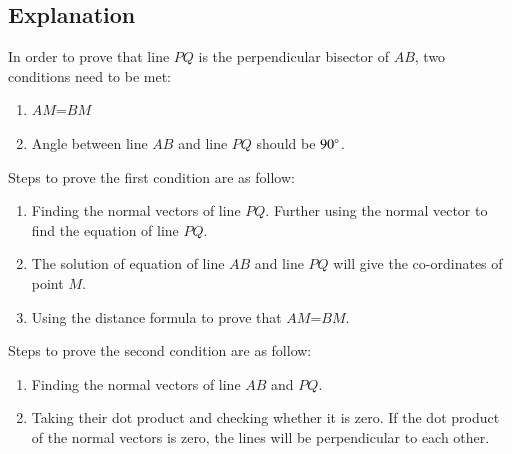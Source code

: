 \documentclass[journal,12pt,twocolumn]{IEEEtran}
\begin{document}
\subsection{Explanation}
In order to prove that line $PQ $ is the perpendicular bisector of $AB$, two conditions need to be met:
\begin{enumerate}
    \item $AM$=$BM$
    \item Angle between line $AB$ and line $PQ$ should be $90\degree$.
\end{enumerate}
Steps to prove the first condition are as follow:
\begin{enumerate}
    \item Finding the normal vectors of line $PQ$. Further using the normal vector to find the equation of line $PQ$. 
    \item The solution of equation of line $AB$ and line $PQ$ will give the co-ordinates of point $M$. 
    \item Using the distance formula to prove that $AM$=$BM$.
\end{enumerate}
Steps to prove the second condition are as follow:
\begin{enumerate}
    \item Finding the normal vectors of line $AB$ and $PQ$.
    \item Taking their dot product and checking whether it is zero. If the dot product of the normal vectors is zero, the lines will be perpendicular to each other.
\end{enumerate}
\end{document}
